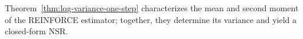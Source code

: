 



Theorem~\ref{thm:lqg-variance-one-step} characterizes the mean and second moment of the REINFORCE estimator; together, they determine its variance and yield a closed-form NSR.

